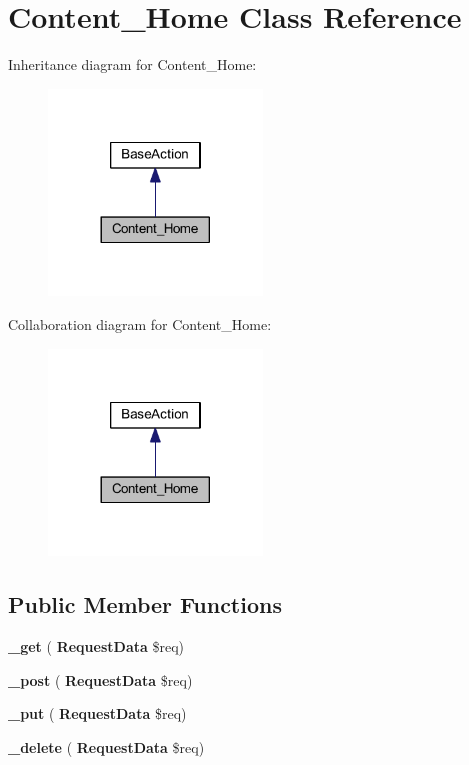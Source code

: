 \section{Content\+\_\+\+Home Class Reference}
\label{class_lora_1_1_content_1_1_content___home}


Inheritance diagram for Content\+\_\+\+Home\+:\nopagebreak
\begin{figure}[H]
\begin{center}
\leavevmode
\includegraphics[width=161pt]{class_lora_1_1_content_1_1_content___home__inherit__graph}
\end{center}
\end{figure}


Collaboration diagram for Content\+\_\+\+Home\+:\nopagebreak
\begin{figure}[H]
\begin{center}
\leavevmode
\includegraphics[width=161pt]{class_lora_1_1_content_1_1_content___home__coll__graph}
\end{center}
\end{figure}
\subsection*{Public Member Functions}
\begin{DoxyCompactItemize}
\item 
\mbox{\label{class_lora_1_1_content_1_1_content___home_a3ad4bf1b146a3180b34d1327ff2abf69}} 
{\bfseries \+\_\+get} (\textbf{ Request\+Data} \$req)
\item 
\mbox{\label{class_lora_1_1_content_1_1_content___home_a50751d47a139282d1c3b08cab1b6562e}} 
{\bfseries \+\_\+post} (\textbf{ Request\+Data} \$req)
\item 
\mbox{\label{class_lora_1_1_content_1_1_content___home_a2affcc8f31c13147c33450193b229194}} 
{\bfseries \+\_\+put} (\textbf{ Request\+Data} \$req)
\item 
\mbox{\label{class_lora_1_1_content_1_1_content___home_ab8ddc6de1e04524212f7d55893f78864}} 
{\bfseries \+\_\+delete} (\textbf{ Request\+Data} \$req)
\end{DoxyCompactItemize}
